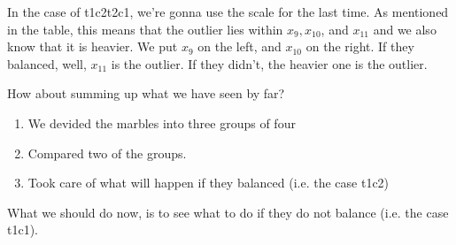 \documentclass{article}
\begin{document}
In the case of t1c2t2c1, we're gonna use the scale for the last time. As mentioned in the table, this means that the outlier lies within $x_9, x_{10}$, and $x_{11}$ and we also know that it is heavier. We put $x_{9}$ on the left, and $x_{10}$ on the right. If they balanced, well, $x_{11}$ is the outlier. If they didn't, the heavier one is the outlier.

How about summing up what we have seen by far? 
\begin{enumerate}
	\item We devided the marbles into three groups of four
	\item Compared two of the groups.
	\item Took care of what will happen if they balanced (i.e. the case t1c2)
\end{enumerate}
What we should do now, is to see what to do if they do not balance (i.e. the case t1c1).
\end{document}
